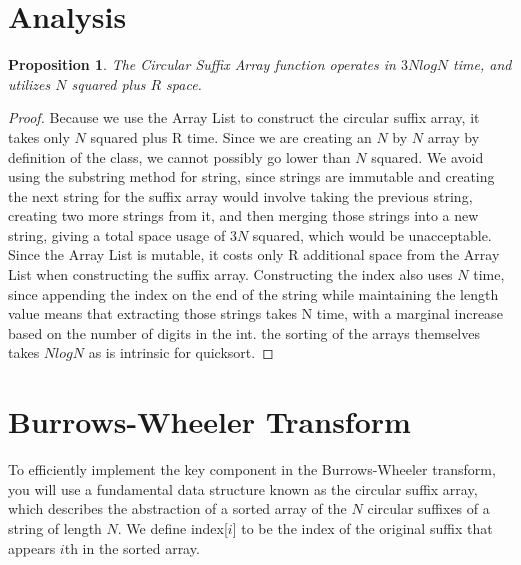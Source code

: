 \documentclass[12pt]{article}
\newtheorem{proposition}[theorem]{Proposition}
\begin{document}
\section{Analysis}

\begin{proposition}
\label{numq}
The Circular Suffix Array function operates in $3NlogN$ time, and utilizes $N$ squared plus $R$ space.
\end{proposition}

\begin{proof}
Because we use the Array List to construct the circular suffix array, it takes only $N$ squared plus  R time. Since we are creating an $N$ by $N$ array by definition of the class, we cannot possibly go lower than $N$ squared. We avoid using the substring method for string, since strings are immutable and creating the next string for the suffix array would involve taking the previous string, creating two more strings from it, and then merging those strings into a new string, giving a total space usage of $3N$ squared, which would be unacceptable. Since the Array List is mutable, it costs only R additional space from the Array List when constructing the suffix array. Constructing the index also uses $N$ time, since appending the index on the end of the string while maintaining the length value means that extracting those strings takes N time, with a marginal increase based on the number of digits in the int. the sorting of the arrays themselves takes $NlogN$ as is intrinsic for quicksort.
\end{proof}





\section{Burrows-Wheeler Transform}
 To efficiently implement the key component in the Burrows-Wheeler transform, you will use a fundamental data structure known as the circular suffix array, which describes the abstraction of a sorted array of the $N$ circular suffixes of a string of length $N$. We define index[$i$] to be the index of the original suffix that appears $i$th in the sorted array.
 
 

\end{document}
